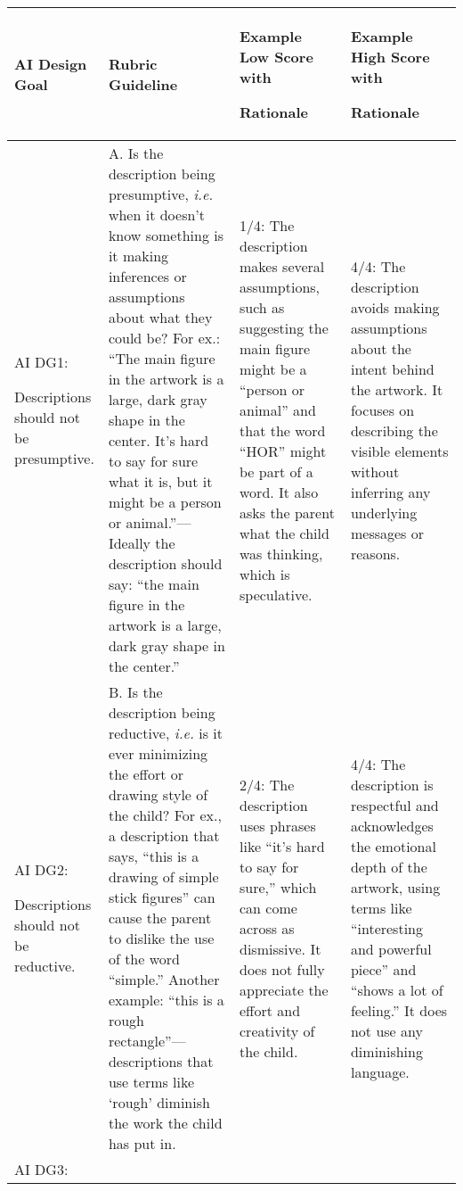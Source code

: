 \documentclass[sigconf]{acmart}
\begin{document}
\begin{table*}[h]
  \centering
  \renewcommand{\arraystretch}{1.5}
  \normalsize
  \resizebox{\textwidth}{!}
  {
    \begin{tabular}{p{0.12\linewidth} p{0.34\linewidth} p{0.27\linewidth} p{0.27\linewidth}}
      \hline
      \textbf{AI Design Goal} 
      & \textbf{Rubric Guideline} 
      & \textbf{Example Low Score with} \hfill 
      
      \textbf{Rationale} 
      & \textbf{Example High Score with} \hfill
      
      \textbf{Rationale} \\
      \hline
        AI DG1: \hfill 
        
        Descriptions should not be presumptive.
        &
        A. Is the description being presumptive, \textit{i.e.} when it doesn't know something is it making inferences or assumptions about what they could be? For ex.: ``The main figure in the artwork is a large, dark gray shape in the center. It's hard to say for sure what it is, but it might be a person or animal.''---Ideally the description should say: ``the main figure in the artwork is a large, dark gray shape in the center.''
        & 
        1/4: The description makes several assumptions, such as suggesting the main figure might be a ``person or animal'' and that the word ``HOR'' might be part of a word. It also asks the parent what the child was thinking, which is speculative.
        &
        4/4: The description avoids making assumptions about the intent behind the artwork. It focuses on describing the visible elements without inferring any underlying messages or reasons.
        \\
        \hline
        AI DG2: \hfill 
        
        Descriptions should not be reductive.
        &
        B. Is the description being reductive, \textit{i.e.} is it ever minimizing the effort or drawing style of the child? For ex., a description that says, ``this is a drawing of simple stick figures'' can cause the parent to dislike the use of the word ``simple.'' Another example: ``this is a rough rectangle''---descriptions that use terms like `rough' diminish the work the child has put in.
        & 
        2/4: The description uses phrases like ``it's hard to say for sure,'' which can come across as dismissive. It does not fully appreciate the effort and creativity of the child.
        &
        4/4: The description is respectful and acknowledges the emotional depth of the artwork, using terms like ``interesting and powerful piece'' and ``shows a lot of feeling.'' It does not use any diminishing language.
        \\
        \hline
        AI DG3: \hfill
        

\end{tabular}}
\end{table*}
\end{document}
